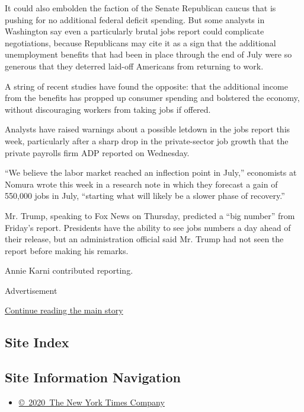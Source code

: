 It could also embolden the faction of the Senate Republican caucus that
is pushing for no additional federal deficit spending. But some analysts
in Washington say even a particularly brutal jobs report could
complicate negotiations, because Republicans may cite it as a sign that
the additional unemployment benefits that had been in place through the
end of July were so generous that they deterred laid-off Americans from
returning to work.

A string of recent studies have found the opposite: that the additional
income from the benefits has propped up consumer spending and bolstered
the economy, without discouraging workers from taking jobs if offered.

Analysts have raised warnings about a possible letdown in the jobs
report this week, particularly after a sharp drop in the private-sector
job growth that the private payrolls firm ADP reported on Wednesday.

``We believe the labor market reached an inflection point in July,''
economists at Nomura wrote this week in a research note in which they
forecast a gain of 550,000 jobs in July, ``starting what will likely be
a slower phase of recovery.''

Mr. Trump, speaking to Fox News on Thursday, predicted a ``big number''
from Friday's report. Presidents have the ability to see jobs numbers a
day ahead of their release, but an administration official said Mr.
Trump had not seen the report before making his remarks.

Annie Karni contributed reporting.

Advertisement

\protect\hyperlink{after-bottom}{Continue reading the main story}

\hypertarget{site-index}{%
\subsection{Site Index}\label{site-index}}

\hypertarget{site-information-navigation}{%
\subsection{Site Information
Navigation}\label{site-information-navigation}}

\begin{itemize}
\tightlist
\item
  \href{https://help.nytimes.com/hc/en-us/articles/115014792127-Copyright-notice}{©~2020~The
  New York Times Company}
\end{itemize}

